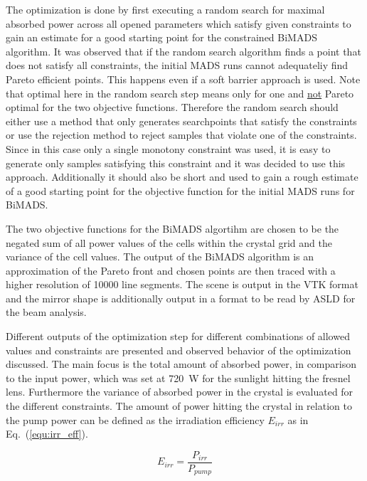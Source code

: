 \documentclass[a4paper,10pt]{article}
\newcommand{\equref}[1]{Eq.~(\ref{#1})}
\begin{document}
    The optimization is done by first executing a random search
    for maximal absorbed power across all opened parameters 
    which satisfy given constraints to gain
    an estimate for a good starting point for the 
    constrained BiMADS algorithm.
    It was observed that if the random search algorithm
    finds a point that does not satisfy all constraints, the initial MADS
    runs cannot adequateliy find Pareto efficient points.
    This happens even if a soft barrier approach is used.
    Note that optimal here in the random search step means only for one
    and \underline{not} Pareto optimal for the two objective functions.
    Therefore the random search should either use a method that only
    generates searchpoints that satisfy the constraints or use the
    rejection method to reject samples that violate one of the
    constraints.
    Since in this case only a single monotony constraint was used,
    it is easy to generate only samples satisfying this constraint
    and it was decided to use this approach.
    Additionally it should also be short and used to
    gain a rough estimate of a good starting point for the objective
    function for the initial MADS runs for BiMADS.

    The two objective functions for the BiMADS algortihm are chosen
    to be the negated sum of all power values of the cells within the
    crystal grid and the variance of the cell values.
    The output of the BiMADS algorithm is an approximation 
    of the Pareto front and chosen points are then traced with
    a higher resolution of 10000 line segments.
    The scene is output in the VTK format
    and the mirror shape is additionally output in a format to 
    be read by ASLD for the beam analysis.

    Different outputs of the optimization step for different 
    combinations of allowed values and constraints are presented and
    observed behavior of the optimization discussed.
    The main focus is the total amount of absorbed power, in
    comparison to the input power, which was set at \SI{720}{W}
    for the sunlight hitting the fresnel lens.
    Furthermore the variance of absorbed power in the crystal
    is evaluated for the different constraints.
    The amount of power hitting the crystal in relation to the
    pump power can be defined as the irradiation efficiency
    $E_{irr}$ as in \equref{equ:irr_eff}.

    \begin{equation}
        \label{equ:irr_eff}
        E_{irr} = \frac{P_{irr}}{P_{pump}}
    \end{equation}
\end{document}
